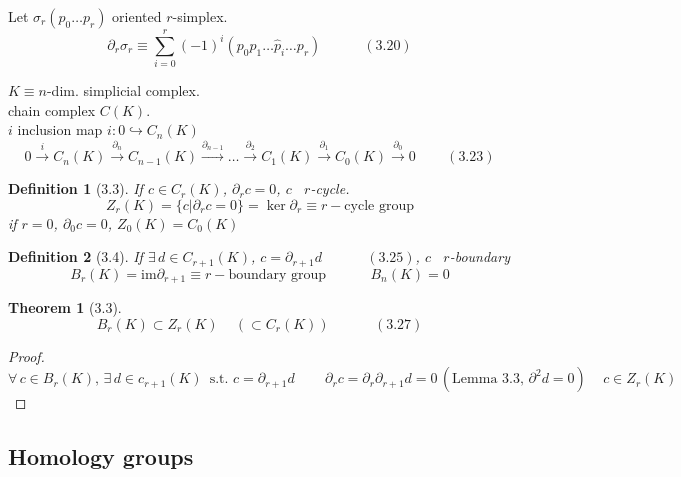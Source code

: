 \documentclass{book}
\newtheorem{theorem}{Theorem}
\newtheorem{definition}{Definition}
\begin{document}
Let $\sigma_r(p_0 \dots p_r)$ oriented $r$-simplex.
\begin{equation}
\partial_r \sigma_r \equiv \sum_{i=0}^r (-1)^i (p_0 p_1 \dots \widehat{p}_i \dots p_r ) \quad \quad \quad (3.20)
\end{equation}


$K \equiv n$-dim. simplicial complex. \\

chain complex $C(K)$.  \\
$i$ inclusion map $i: 0 \hookrightarrow C_n(K)$
\begin{equation}
0 \xrightarrow{i} C_n(K) \xrightarrow{\partial_n} C_{n-1}(K) \xrightarrow{\partial_{n-1}} \dots \xrightarrow{\partial_2} C_1(K) \xrightarrow{\partial_1} C_0(K) \xrightarrow{\partial_0} 0 \quad \quad \, (3.23)
\end{equation}

\begin{definition}[3.3] If $c \in C_r(K)$, $\partial_r c = 0$, $c$ \, $r$-cycle. 
\[
\boxed{ Z_r(K) = \lbrace c | \partial_r c =0 \rbrace  = \ker{\partial_r} \equiv r-\text{cycle group} }
\]
if $r =0$, $\partial_0 c =0$, $Z_0(K) = C_0(K)$
\end{definition}

\begin{definition}[3.4] If $\exists \, d \in C_{r+1}(K)$, $c = \partial_{r+1} d \quad \quad \quad \, (3.25)$, $c$ \, $r$-boundary
\[
\boxed{ B_r(K) = \text{im}{\partial_{r+1}} \equiv r-\text{boundary group} \quad \quad \quad \, B_n(K) =0  }
\]
\end{definition}

\begin{theorem}[3.3] 
\begin{equation}
  B_r(K) \subset Z_r(K) \quad \, (\subset C_r(K)) \quad \quad \quad \, (3.27)
\end{equation}
\end{theorem}

\begin{proof} 
\[  
\forall \, c \in B_r(K), \, \exists \, d \in c_{r+1}(K) \, \text{ s.t. } c = \partial_{r+1}d \quad \quad \, \partial_r c  = \partial_r \partial_{r+1} d = 0 \, (\text{Lemma } 3.3, \, \partial^2 d =0) \quad \, c \in Z_r(K)
\]
\end{proof}

\subsection{Homology groups}
\end{document}
